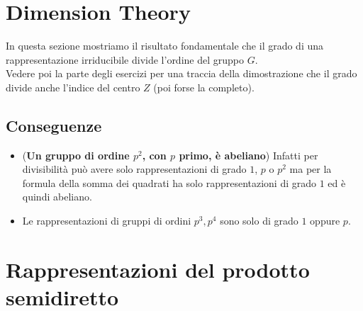 \documentclass[a4paper,NoNotes,GeneralMath]{stdmdoc}
\begin{document}
	\section{Dimension Theory}
	In questa sezione mostriamo il risultato fondamentale che il grado di una rappresentazione irriducibile divide l'ordine del gruppo $G$.  \\
	Vedere poi la parte degli esercizi per una traccia della dimostrazione che il grado divide anche l'indice del centro $Z$ (poi forse la completo). \\
%

	\subsection{Conseguenze}
	\begin{itemize}
		\item ({\bf Un gruppo di ordine $p^2$, con $p$ primo, è abeliano}) Infatti per divisibilità può avere solo rappresentazioni di grado $1$, $p$ o $p^2$ ma per la formula della somma dei quadrati ha solo rappresentazioni di grado $1$ ed è quindi abeliano.
		\item Le rappresentazioni di gruppi di ordini $p^3, p^4$ sono solo di grado $1$ oppure $p$.
	\end{itemize}

	\section{Rappresentazioni del prodotto semidiretto}
\end{document}
